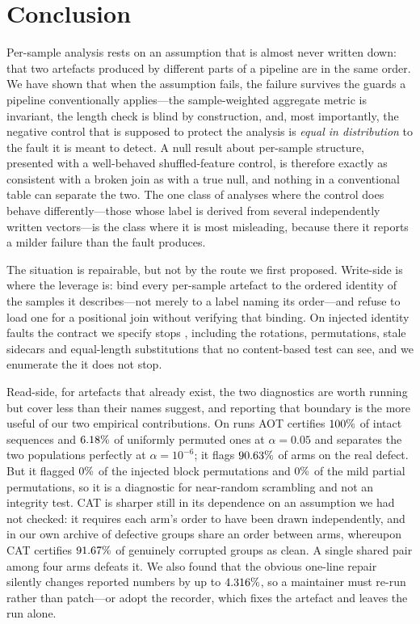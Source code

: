 \documentclass[a4paper,fleqn]{cas-sc}
\begin{document}
\section{Conclusion}
\label{sec:conclusion}

Per-sample analysis rests on an assumption that is almost never written down: that
two artefacts produced by different parts of a pipeline are in the same order. We
have shown that when the assumption fails, the failure survives the guards a
pipeline conventionally applies---the sample-weighted aggregate metric is invariant,
the length check is blind
by construction, and, most importantly, the negative control that is supposed to
protect the analysis is \emph{equal in distribution} to the fault it is meant to
detect. A null result about per-sample structure, presented with a well-behaved
shuffled-feature control, is therefore exactly as consistent with a broken join as
with a true null, and nothing in a conventional table can separate the two. The one
class of analyses where the control does behave differently---those whose label is
derived from several independently written vectors---is the class where it is most
misleading, because there it reports a milder failure than the fault produces.

The situation is repairable, but not by the route we first proposed. Write-side is
where the leverage is: bind every per-sample artefact to the ordered identity of the
samples it describes---not merely to a label naming its order---and refuse to load
one for a positional join without verifying that binding. On
\NumContractFaults{} injected identity faults the contract we specify stops
\NumContractDetected{}, including the rotations, permutations, stale sidecars and
equal-length substitutions that no content-based test can see, and we enumerate the
\NumContractUndetected{} it does not stop.

Read-side, for artefacts that already exist, the two diagnostics are worth running
but cover less than their names suggest, and reporting that boundary is the more
useful of our two empirical contributions. On \NumRuns{} runs AOT certifies
$100\%$ of intact
sequences and $6.18\%$ of uniformly permuted ones at $\alpha = 0.05$
and separates the two populations perfectly at $\alpha = 10^{-6}$; it flags
$90.63\%$ of arms on the real defect. But it flagged
$0\%$ of the injected block permutations and
$0\%$ of the mild partial permutations, so it is a
diagnostic for near-random scrambling and not an integrity test. CAT is
sharper still in its dependence on an assumption we had not checked: it requires
each arm's order to have been drawn independently, and in our own archive
\NumObsPermPartialShared{} of \NumObsPermGroups{} defective groups share an order
between arms, whereupon CAT certifies $91.67\%$ of genuinely corrupted
groups as clean. A single shared pair among four arms defeats it. We also found
that the obvious one-line repair
silently changes reported numbers by up to $4.316\%$, so a maintainer must
re-run rather than patch---or adopt the recorder, which fixes the artefact and
leaves the run alone.
\end{document}
